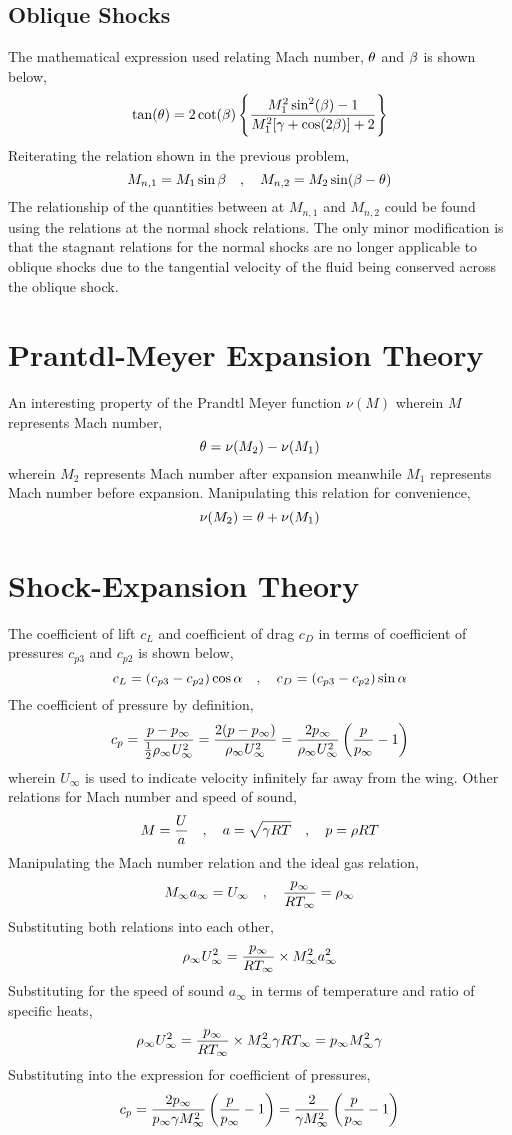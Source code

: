\documentclass[class=report, 12pt, crop=false]{standalone}
\begin{document}
\begin{center}
\subsection{Oblique Shocks}
\begin{comment}
\end{comment}
The mathematical expression used relating Mach number, $\theta$ and $\beta$ is shown below,
$$\tan(\theta) = 2\cot(\beta)\left\{\frac{M_1^2\sin^2(\beta) - 1}{M_1^2[\gamma+\cos(2\beta)]+2}\right\}$$
Reiterating the relation shown in the previous problem,
$$M_{n,1} = M_1\sin\beta \quad,\quad M_{n,2} = M_2\sin(\beta-\theta)$$
The relationship of the quantities between at $M_{n,1}$ and $M_{n,2}$ could be found using the relations at the normal shock relations. The only minor modification is that the stagnant relations for the normal shocks are no longer applicable to oblique shocks due to the tangential velocity of the fluid being conserved across the oblique shock.
\section{Prantdl-Meyer Expansion Theory}
\begin{comment}
\end{comment}
An interesting property of the Prandtl Meyer function $\nu(M)$ wherein $M$ represents Mach number,
$$\theta = \nu(M_2) - \nu(M_1)$$
wherein $M_2$ represents Mach number after expansion meanwhile $M_1$ represents Mach number before expansion. Manipulating this relation for convenience,
$$\nu(M_2) = \theta + \nu(M_1)$$
\section{Shock-Expansion Theory}
\begin{comment}
\end{comment}
The coefficient of lift $c_L$ and coefficient of drag $c_D$ in terms of coefficient of pressures $c_{p3}$ and $c_{p2}$ is shown below,
$$c_L = (c_{p3}-c_{p2})\cos\alpha \quad,\quad c_D = (c_{p3}-c_{p2})\sin\alpha$$
The coefficient of pressure by definition,
$$c_p = \frac{p-p_\infty}{\frac{1}{2}\rho_\infty U_\infty^2} = \frac{2(p-p_\infty)}{\rho_\infty U_\infty^2} = \frac{2 p_\infty}{\rho_\infty U_\infty^2}\left(\frac{p}{p_\infty}-1\right)$$
wherein $U_\infty$ is used to indicate velocity infinitely far away from the wing. Other relations for Mach number and speed of sound,
$$M=\frac{U}{a} \quad,\quad a = \sqrt{\gamma RT} \quad,\quad p=\rho R T$$
Manipulating the Mach number relation and the ideal gas relation,
$$M_\infty a_\infty = U_\infty \quad,\quad \frac{p_\infty}{R T_\infty} = \rho_\infty $$
Substituting both relations into each other,
$$\rho_\infty U_\infty^2 = \frac{p_\infty}{R T_\infty}\times M_\infty^2 a_\infty^2$$
Substituting for the speed of sound $a_\infty$ in terms of temperature and ratio of specific heats,
$$\rho_\infty U_\infty^2 = \frac{p_\infty}{R T_\infty}\times M_\infty^2 \gamma R T_\infty = p_\infty M_\infty^2 \gamma $$
Substituting into the expression for coefficient of pressures,
$$c_p = \frac{2 p_\infty}{p_\infty \gamma M_\infty^2}\left(\frac{p}{p_\infty}-1\right) = \frac{2 }{\gamma M_\infty^2}\left(\frac{p}{p_\infty}-1\right)$$

\end{center}
\end{document}
